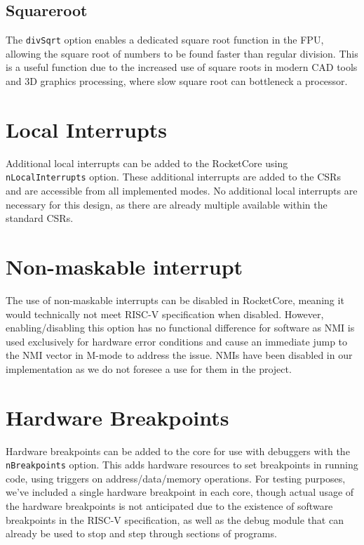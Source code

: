 \subsection{Squareroot}
The \texttt{divSqrt} option enables a dedicated square root function in the FPU, allowing the square root of numbers to be found faster than regular division. This is a useful function due to the increased use of square roots in modern CAD tools and 3D graphics processing, where slow square root can bottleneck a processor\cite{squareroot-fpu}.

\section{Local Interrupts}
Additional local interrupts can be added to the RocketCore using \texttt{nLocalInterrupts} option. These additional interrupts are added to the CSRs and are accessible from all implemented modes. No additional local interrupts are necessary for this design, as there are already multiple available within the standard CSRs.

\section{Non-maskable interrupt}
The use of non-maskable interrupts can be disabled in RocketCore, meaning it would technically not meet RISC-V specification when disabled. However, enabling/disabling this option has no functional difference for software as NMI is used exclusively for hardware error conditions and cause an immediate jump to the NMI vector in M-mode to address the issue. NMIs have been disabled in our implementation as we do not foresee a use for them in the project.

\section{Hardware Breakpoints}
Hardware breakpoints can be added to the core for use with debuggers with the \texttt{nBreakpoints} option. This adds hardware resources to set breakpoints in running code, using triggers on address/data/memory operations. For testing purposes, we've included a single hardware breakpoint in each core, though actual usage of the hardware breakpoints is not anticipated due to the existence of software breakpoints in the RISC-V specification, as well as the debug module that can already be used to stop and step through sections of programs.

